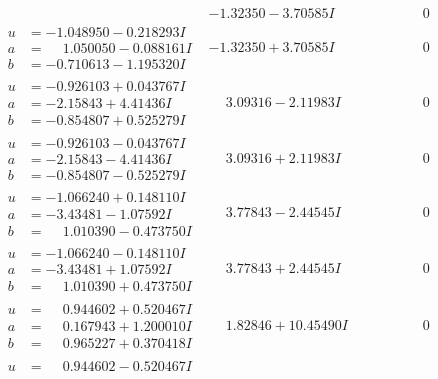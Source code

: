\documentclass[1p]{elsarticle_modified}
\theoremstyle{definition}
\begin{document}
$$\begin{array}{c|c|c}
 & -1.32350 - 3.70585 I & \phantom{-0.000000 } 0 \\ \hline\begin{aligned}
u &= -1.048950 - 0.218293 I \\
a &= \phantom{-}1.050050 - 0.088161 I \\
b &= -0.710613 - 1.195320 I\end{aligned}
 & -1.32350 + 3.70585 I & \phantom{-0.000000 } 0 \\ \hline\begin{aligned}
u &= -0.926103 + 0.043767 I \\
a &= -2.15843 + 4.41436 I \\
b &= -0.854807 + 0.525279 I\end{aligned}
 & \phantom{-}3.09316 - 2.11983 I & \phantom{-0.000000 } 0 \\ \hline\begin{aligned}
u &= -0.926103 - 0.043767 I \\
a &= -2.15843 - 4.41436 I \\
b &= -0.854807 - 0.525279 I\end{aligned}
 & \phantom{-}3.09316 + 2.11983 I & \phantom{-0.000000 } 0 \\ \hline\begin{aligned}
u &= -1.066240 + 0.148110 I \\
a &= -3.43481 - 1.07592 I \\
b &= \phantom{-}1.010390 - 0.473750 I\end{aligned}
 & \phantom{-}3.77843 - 2.44545 I & \phantom{-0.000000 } 0 \\ \hline\begin{aligned}
u &= -1.066240 - 0.148110 I \\
a &= -3.43481 + 1.07592 I \\
b &= \phantom{-}1.010390 + 0.473750 I\end{aligned}
 & \phantom{-}3.77843 + 2.44545 I & \phantom{-0.000000 } 0 \\ \hline\begin{aligned}
u &= \phantom{-}0.944602 + 0.520467 I \\
a &= \phantom{-}0.167943 + 1.200010 I \\
b &= \phantom{-}0.965227 + 0.370418 I\end{aligned}
 & \phantom{-}1.82846 + 10.45490 I & \phantom{-0.000000 } 0 \\ \hline\begin{aligned}
u &= \phantom{-}0.944602 - 0.520467 I \\

\end{aligned}
\end{array}$$
\end{document}
